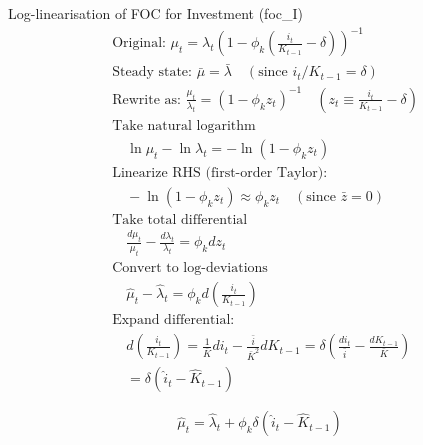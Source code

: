 \documentclass[11pt,preprint]{elsarticle}
\numberwithin{equation}{section}
\numberwithin{figure}{section}
\numberwithin{table}{section}
\begin{document}
Log-linearisation of FOC for Investment (foc\_I) \begin{align*}
& \text{Original: } \mu_t = \lambda_t \left( 1 - \phi_k \left( \frac{i_t}{K_{t-1}} - \delta \right) \right)^{-1} \\[6pt]
& \text{Steady state: } \bar{\mu} = \bar{\lambda} \quad (\text{since } i_t/K_{t-1} = \delta) \\[6pt]
& \text{Rewrite as: } \frac{\mu_t}{\lambda_t} = \left( 1 - \phi_k z_t \right)^{-1} \quad \left(z_t \equiv \frac{i_t}{K_{t-1}} - \delta\right) \\[6pt]
& \text{Take natural logarithm} \\
& \quad \ln \mu_t - \ln \lambda_t = -\ln(1 - \phi_k z_t) \\[6pt]
& \text{Linearize RHS (first-order Taylor):} \\
& \quad -\ln(1 - \phi_k z_t) \approx \phi_k z_t \quad (\text{since } \bar{z}=0) \\[6pt]
& \text{Take total differential} \\
& \quad \frac{d\mu_t}{\mu_t} - \frac{d\lambda_t}{\lambda_t} = \phi_k dz_t \\[6pt]
& \text{Convert to log-deviations} \\
& \quad \hat{\mu}_t - \hat{\lambda}_t = \phi_k d\left(\frac{i_t}{K_{t-1}}\right) \\[6pt]
& \text{Expand differential:} \\
& \quad d\left(\frac{i_t}{K_{t-1}}\right) = \frac{1}{\bar{K}} di_t - \frac{\bar{i}}{\bar{K}^2} dK_{t-1} = \delta \left( \frac{di_t}{\bar{i}} - \frac{dK_{t-1}}{\bar{K}} \right) \\[6pt]
& \quad = \delta (\hat{i}_t - \hat{K}_{t-1})
\end{align*}

\begin{equation}\label{foc_I_linearised_app}
\boxed{\hat{\mu}_t = \hat{\lambda}_t + \phi_k \delta \left( \hat{i}_t - \hat{K}_{t-1} \right)}
\end{equation}
\end{document}
